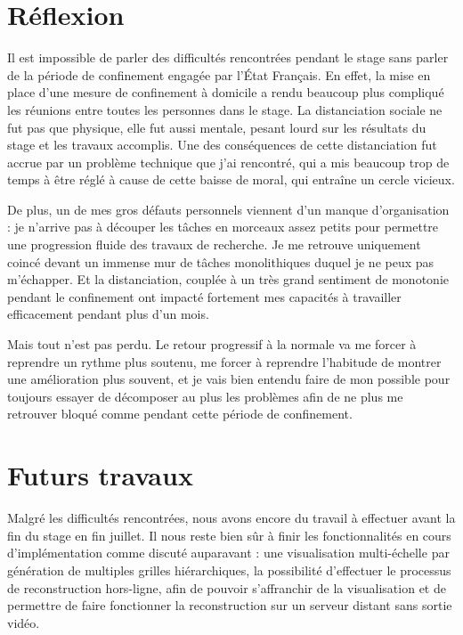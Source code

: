 {	\section{Réflexion}
	{
		\par
		Il est impossible de parler des difficultés rencontrées pendant le stage sans parler de la période de confinement engagée par l'\'Etat Français. En effet, la mise en place d'une mesure de confinement à domicile a rendu beaucoup plus compliqué les réunions entre toutes les personnes dans le stage. La distanciation sociale ne fut pas que physique, elle fut aussi mentale, pesant lourd sur les résultats du stage et les travaux accomplis. Une des conséquences de cette distanciation fut accrue par un problème technique que j'ai rencontré, qui a mis beaucoup trop de temps à être réglé à cause de cette baisse de moral, qui entraîne un cercle vicieux.\par
		De plus, un de mes gros défauts personnels viennent d'un manque d'organisation : je n'arrive pas à découper les tâches en morceaux assez petits pour permettre une progression fluide des travaux de recherche. Je me retrouve uniquement coincé devant un immense mur de tâches monolithiques duquel je ne peux pas m'échapper. Et la distanciation, couplée à un très grand sentiment de monotonie pendant le confinement ont impacté fortement mes capacités à travailler efficacement pendant plus d'un mois.\par
		Mais tout n'est pas perdu. Le retour progressif à la normale va me forcer à reprendre un rythme plus soutenu, me forcer à reprendre l'habitude de montrer une amélioration plus souvent, et je vais bien entendu faire de mon possible pour toujours essayer de décomposer au plus les problèmes afin de ne plus me retrouver bloqué comme pendant cette période de confinement.
	}

	\section{Futurs travaux}
	{
		\par
		Malgré les difficultés rencontrées, nous avons encore du travail à effectuer avant la fin du stage en fin juillet. Il nous reste bien sûr à finir les fonctionnalités en cours d'implémentation comme discuté auparavant : une visualisation multi-échelle par génération de multiples grilles hiérarchiques, la possibilité d'effectuer le processus de reconstruction hors-ligne, afin de pouvoir s'affranchir de la visualisation et de permettre de faire fonctionner la reconstruction sur un serveur distant sans sortie vidéo.\par
	}
}


